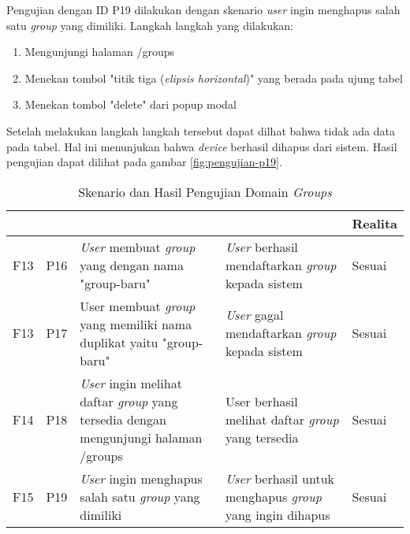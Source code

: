 Pengujian dengan ID P19 dilakukan dengan skenario \textit{user} ingin menghapus salah satu \textit{group} yang dimiliki. Langkah langkah yang dilakukan:
\begin{enumerate}
  \item Mengunjungi halaman /groups
  \item Menekan tombol "titik tiga (\textit{elipsis horizontal})" yang berada pada ujung tabel
  \item Menekan tombol "delete" dari popup modal
\end{enumerate}

Setelah melakukan langkah langkah tersebut dapat dilhat bahwa tidak ada data pada tabel. Hal ini menunjukan bahwa \textit{device} berhasil dihapus dari sistem. Hasil pengujian dapat dilihat pada gambar \ref{fig:pengujian-p19}.

\bgroup
\begin{table}[ht]
  \def\arraystretch{1.3}
  \caption{Skenario dan Hasil Pengujian Domain \textit{Groups}}
  \label{tab:pengujian-domain-groups}
  \centering
  \begin{tabular}{|p{2cm}|p{2cm}|p{4cm}|p{3cm}|p{2cm}|}
    \hline
    \centering{ID Fungsional} & \centering{ID Pengujian} & \centering{Skenario}                                                                               & \centering{Ekspektasi}                                                   & Realita \\
    \hline
    F13                       & P16                      & \textit{User} membuat \textit{group} yang dengan nama "group-baru"                                 & \textit{User} berhasil mendaftarkan \textit{group} kepada sistem         & Sesuai  \\
    \hline
    F13                       & P17                      & {User} membuat \textit{group} yang memiliki nama duplikat yaitu "group-baru"                       & \textit{User} gagal mendaftarkan \textit{group} kepada sistem            & Sesuai  \\
    \hline
    F14                       & P18                      & \textit{User} ingin melihat daftar \textit{group} yang tersedia dengan mengunjungi halaman /groups & User berhasil melihat daftar \textit{group} yang tersedia                & Sesuai  \\
    \hline
    F15                       & P19                      & \textit{User} ingin menghapus salah satu \textit{group} yang dimiliki                              & \textit{User} berhasil untuk menghapus \textit{group} yang ingin dihapus & Sesuai  \\
    \hline
  \end{tabular}
\end{table}
\egroup
